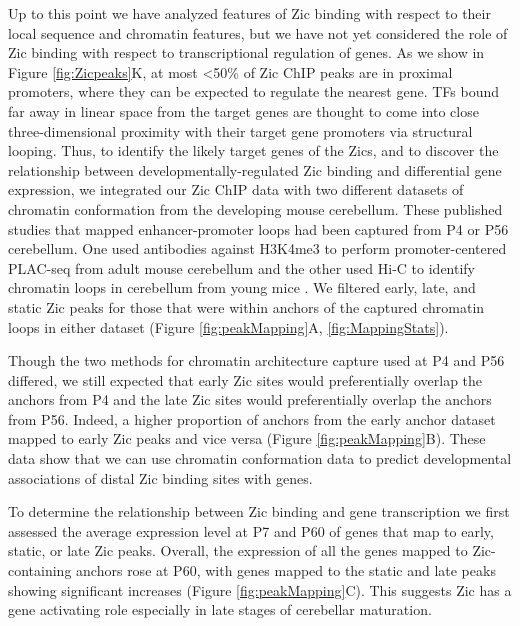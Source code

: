 \documentclass[fleqn,10pt]{wlscirep}
\begin{document}
Up to this point we have analyzed features of Zic binding with respect to their local sequence and chromatin features, but we have not yet considered the role of Zic binding with respect to transcriptional regulation of genes. As we show in Figure \ref{fig:Zicpeaks}K, at most \textless 50\% of Zic ChIP peaks are in proximal promoters, where they can be expected to regulate the nearest gene. TFs bound far away in linear space from the target genes are thought to come into close three-dimensional proximity with their target gene promoters via structural looping. Thus, to identify the likely target genes of the Zics, and to discover the relationship between developmentally-regulated Zic binding and differential gene expression, we integrated our Zic ChIP data with two different datasets of chromatin conformation \cite{Yamada2019SensoryLearning,Goodman2019RegulationRemodeling} from the developing mouse cerebellum. These published studies that mapped enhancer-promoter loops  had been captured from P4 or P56 cerebellum. One used antibodies against H3K4me3 to perform promoter-centered PLAC-seq from adult mouse cerebellum \cite{Yamada2019SensoryLearning} and the other used Hi-C to identify chromatin loops in cerebellum from young mice \cite{Goodman2019RegulationRemodeling}. We filtered early, late, and static Zic peaks for those that were within anchors of the captured chromatin loops in either dataset (Figure \ref{fig:peakMapping}A, \ref{fig:MappingStats}). 

Though the two methods for chromatin architecture capture used at P4 and P56 differed, we still expected that early Zic sites would preferentially overlap the anchors from P4 and the late Zic sites would preferentially overlap the anchors from P56. Indeed, a higher proportion of anchors from the early anchor dataset mapped to early Zic peaks and vice versa (Figure \ref{fig:peakMapping}B). These data show that we can use chromatin conformation data to predict developmental associations of distal Zic binding sites with genes. 

To determine the relationship between Zic binding and gene transcription we first assessed the average expression level at P7 and P60 of genes that map to early, static, or late Zic peaks. Overall, the expression of all the genes mapped to Zic-containing anchors rose at P60, with genes mapped to the static and late peaks showing significant increases (Figure \ref{fig:peakMapping}C). This suggests Zic has a gene activating role especially in late stages of cerebellar maturation.  
\end{document}
